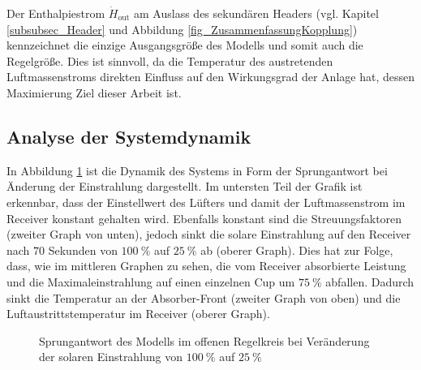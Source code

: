 Der Enthalpiestrom $\dot{H}_{\mathrm{out}}$ am Auslass des sekundären Headers (vgl. Kapitel \ref{subsubsec_Header} und Abbildung \ref{fig_ZusammenfassungKopplung}) kennzeichnet die einzige Ausgangsgröße des Modells und somit auch die Regelgröße.
Dies ist sinnvoll, da die Temperatur des austretenden Luftmassenstroms direkten Einfluss auf den Wirkungsgrad der Anlage hat, dessen Maximierung Ziel dieser Arbeit ist.

\subsection{Analyse der Systemdynamik} \label{subsec_Systemdynamik}
In Abbildung \ref{fig_Sprungantwort} ist die Dynamik des Systems in Form der Sprungantwort bei Änderung der Einstrahlung dargestellt.
Im untersten Teil der Grafik ist erkennbar, dass der Einstellwert des Lüfters und damit der Luftmassenstrom im Receiver konstant gehalten wird.
Ebenfalls konstant sind die Streuungsfaktoren (zweiter Graph von unten), jedoch sinkt die solare Einstrahlung auf den Receiver nach $70$ Sekunden von $\SI{100}{\percent}$ auf $\SI{25}{\percent}$ ab (oberer Graph).
Dies hat zur Folge, dass, wie im mittleren Graphen zu sehen, die vom Receiver absorbierte Leistung und die Maximaleinstrahlung auf einen einzelnen Cup um $\SI{75}{\percent}$ abfallen.
Dadurch sinkt die Temperatur an der Absorber-Front (zweiter Graph von oben) und die Luftaustrittstemperatur im Receiver (oberer Graph).

\begin{figure}[h!]
    \centering
    \setlength{\fboxsep}{1pt}
    \setlength{\fboxrule}{1pt}
    \caption[Sprungantwort des Modells im offenen Regelkreis bei Veränderung der solaren Einstrahlung von $\SI{100}{\percent}$ auf $\SI{25}{\percent}$]{Sprungantwort des Modells im offenen Regelkreis bei Veränderung der solaren Einstrahlung von $\SI{100}{\percent}$ auf $\SI{25}{\percent}$}
    \label{fig_Sprungantwort}
\end{figure}

